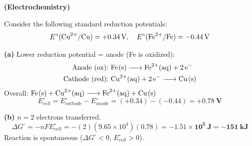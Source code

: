 \documentclass[addpoints]{exam}
\begin{document}
\begin{questions}
\question \textbf{(Electrochemistry)}

Consider the following standard reduction potentials:
\[
E^\circ(\ce{Cu^{2+}/Cu}) = +\SI{0.34}{V}, \quad E^\circ(\ce{Fe^{2+}/Fe}) = -\SI{0.44}{V}
\]
\begin{solution}[10cm]
\textbf{(a)} Lower reduction potential = anode (Fe is oxidized):
\begin{align*}
\text{Anode (ox):}\  & \ce{Fe(s) -> Fe^{2+}(aq) + 2e-} \\
\text{Cathode (red):}\  & \ce{Cu^{2+}(aq) + 2e- -> Cu(s)}
\end{align*}
Overall: $\ce{Fe(s) + Cu^{2+}(aq) -> Fe^{2+}(aq) + Cu(s)}$
\[
E^\circ_{cell} = E^\circ_{cathode} - E^\circ_{anode} = (+0.34) - (-0.44) = \mathbf{+0.78\ V}
\]

\textbf{(b)} $n = 2$ electrons transferred.
\[
\Delta G^\circ = -nFE^\circ_{cell} = -(2)(9.65\times10^4)(0.78) = \mathbf{-1.51\times10^5\ J
= -151\ kJ}
\]
Reaction is spontaneous ($\Delta G^\circ < 0$, $E^\circ_{cell} > 0$).


\end{solution}
\end{questions}
\end{document}

